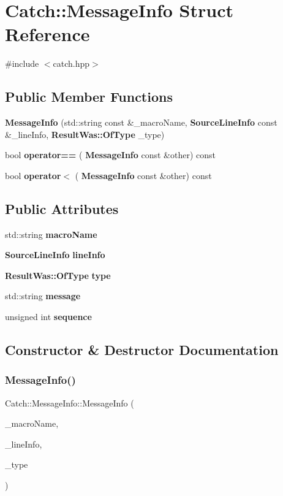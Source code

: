 \section{Catch\+:\+:Message\+Info Struct Reference}
\label{struct_catch_1_1_message_info}


{\ttfamily \#include $<$catch.\+hpp$>$}

\subsection*{Public Member Functions}
\begin{DoxyCompactItemize}
\item 
\textbf{ Message\+Info} (std\+::string const \&\+\_\+macro\+Name, \textbf{ Source\+Line\+Info} const \&\+\_\+line\+Info, \textbf{ Result\+Was\+::\+Of\+Type} \+\_\+type)
\item 
bool \textbf{ operator==} (\textbf{ Message\+Info} const \&other) const
\item 
bool \textbf{ operator$<$} (\textbf{ Message\+Info} const \&other) const
\end{DoxyCompactItemize}
\subsection*{Public Attributes}
\begin{DoxyCompactItemize}
\item 
std\+::string \textbf{ macro\+Name}
\item 
\textbf{ Source\+Line\+Info} \textbf{ line\+Info}
\item 
\textbf{ Result\+Was\+::\+Of\+Type} \textbf{ type}
\item 
std\+::string \textbf{ message}
\item 
unsigned int \textbf{ sequence}
\end{DoxyCompactItemize}


\subsection{Constructor \& Destructor Documentation}
\mbox{\label{struct_catch_1_1_message_info_a2e336c33ebef7af3c1bbae6a56e14f8a}} 
\subsubsection{Message\+Info()}
{\footnotesize\ttfamily Catch\+::\+Message\+Info\+::\+Message\+Info (\begin{DoxyParamCaption}\item[{std\+::string const \&}]{\+\_\+macro\+Name,  }\item[{\textbf{ Source\+Line\+Info} const \&}]{\+\_\+line\+Info,  }\item[{\textbf{ Result\+Was\+::\+Of\+Type}}]{\+\_\+type }\end{DoxyParamCaption})}



